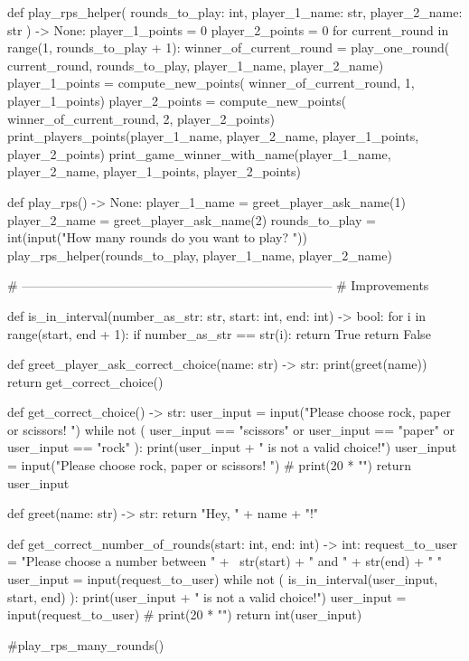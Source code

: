 \documentclass[a4paper, DIV = calc]{scrartcl}
\newcommand{\expandpyconc}[1]{\expandafter\reallyexpandpyconc\expandafter{#1}}
\newcommand{\reallyexpandpyconc}[1]{\pyconc{exec(compile(open('#1', 'rb').read(), '#1', 'exec'))}}
\newenvironment{pyconcodeblck}[1]
{\newcommand{\snippetfile}{snippet-#1.py}
	\VerbatimEnvironment
	\begin{VerbatimOut}{\snippetfile}}
	{\end{VerbatimOut}
	\expandpyconc{\snippetfile}}
\begin{document}
\begin{pyconcodeblck}{rps}
def play_rps_helper(
    rounds_to_play: int, player_1_name: str, player_2_name: str
) -> None:
    player_1_points = 0
    player_2_points = 0
    for current_round in range(1, rounds_to_play + 1):
        winner_of_current_round = play_one_round(
            current_round, rounds_to_play, player_1_name, player_2_name)
        player_1_points = compute_new_points(
            winner_of_current_round, 1, player_1_points)
        player_2_points = compute_new_points(
            winner_of_current_round, 2, player_2_points)
        print_players_points(player_1_name, player_2_name,
                             player_1_points, player_2_points)
    print_game_winner_with_name(player_1_name, player_2_name,
                        player_1_points, player_2_points)


def play_rps() -> None:
    player_1_name = greet_player_ask_name(1)
    player_2_name = greet_player_ask_name(2)
    rounds_to_play = int(input("How many rounds do you want to play? "))
    play_rps_helper(rounds_to_play, player_1_name, player_2_name)



# --------------------------------------------------------------------------
# Improvements


def is_in_interval(number_as_str: str, start: int, end: int) -> bool:
    for i in range(start, end + 1):
        if number_as_str == str(i):
            return True
    return False


def greet_player_ask_correct_choice(name: str) -> str:
    print(greet(name))
    return get_correct_choice()


def get_correct_choice() -> str:
    user_input = input("Please choose rock, paper or scissors! ")
    while not (
        user_input == "scissors" or user_input == "paper" or user_input == "rock"
    ):
        print(user_input + " is not a valid choice!")
        user_input = input("Please choose rock, paper or scissors! ")
    # print(20 * "\n")
    return user_input


def greet(name: str) -> str:
    return "Hey, " + name + "!"


def get_correct_number_of_rounds(start: int, end: int) -> int:
    request_to_user = "Please choose a number between " + \
        str(start) + " and " + str(end) + " "
    user_input = input(request_to_user)
    while not (
        is_in_interval(user_input, start, end)
    ):
        print(user_input + " is not a valid choice!")
        user_input = input(request_to_user)
    # print(20 * "\n")
    return int(user_input)


#play_rps_many_rounds()


\end{pyconcodeblck}
\end{document}
